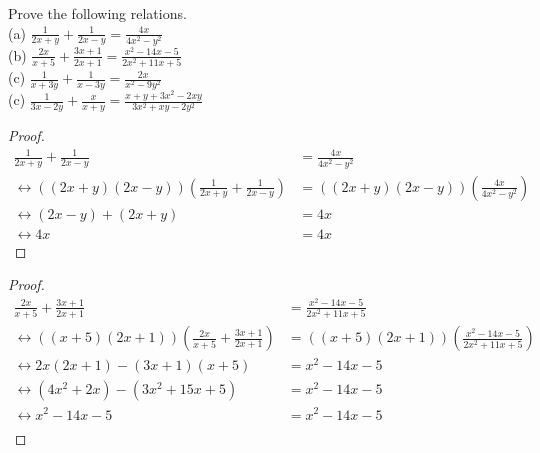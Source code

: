 \begin{tcolorbox}[title=Problem 3, breakable]
Prove the following relations. \\
(a) $\frac{1}{2x + y} + \frac{1}{2x - y} = \frac{4x}{4x^2 - y^2}$ \\
(b) $\frac{2x}{x + 5} + \frac{3x + 1}{2x + 1} = \frac{x^2 - 14x - 5}{2x^2 + 11x + 5}$ \\
(c) $\frac{1}{x + 3y} + \frac{1}{x - 3y} = \frac{2x}{x^2 - 9y^2}$ \\
(c) $\frac{1}{3x - 2y} + \frac{x}{x + y} = \frac{x + y + 3x^2 - 2xy}{3x^2 + xy - 2y^2}$
\end{tcolorbox}

\begin{proof}
\begin{align*}
\frac{1}{2x + y} + \frac{1}{2x - y} &= \frac{4x}{4x^2 - y^2} && \\
\leftrightarrow \left((2x + y)(2x - y)\right)\left(\frac{1}{2x + y} + \frac{1}{2x - y}\right) 
    &= \left((2x + y)(2x - y)\right)\left(\frac{4x}{4x^2 - y^2}\right) && \\
\leftrightarrow (2x - y) + (2x + y) &= 4x && \\
\leftrightarrow 4x &= 4x 
\end{align*}
\end{proof}
\begin{proof}
\begin{align*}
\frac{2x}{x + 5} + \frac{3x + 1}{2x + 1} &= \frac{x^2 - 14x - 5}{2x^2 + 11x + 5} && \\
\leftrightarrow \left((x + 5)(2x + 1)\right)\left(\frac{2x}{x + 5} + \frac{3x + 1}{2x + 1}\right)
    &= \left((x + 5)(2x + 1)\right)\left(\frac{x^2 - 14x - 5}{2x^2 + 11x + 5}\right) && \\
\leftrightarrow 2x(2x + 1) - (3x + 1)(x + 5) &= x^2 - 14x - 5 && \\
\leftrightarrow (4x^2 + 2x) - (3x^2 + 15x + 5) &= x^2 - 14x - 5 && \\
\leftrightarrow x^2 - 14x - 5 &= x^2 - 14x - 5 && \\
\end{align*}
\end{proof}

